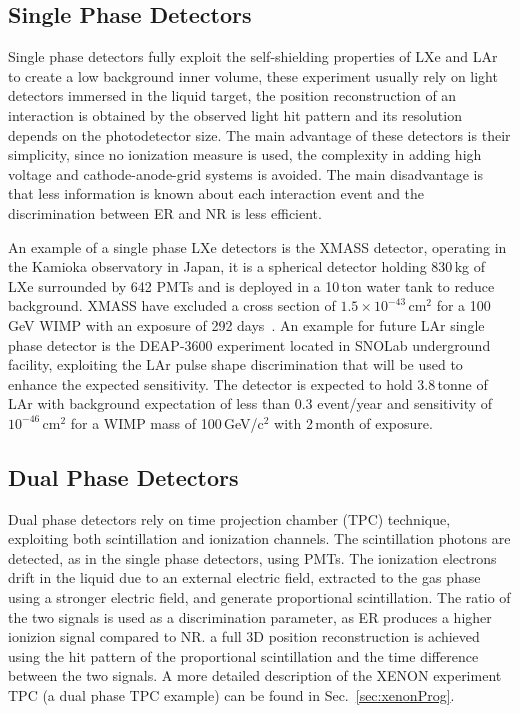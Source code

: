 \subsection{Single Phase Detectors}
\label{sec:singlePhase}
 
Single phase detectors fully exploit the self-shielding properties of LXe and LAr to create a low background inner volume, these experiment usually rely on light detectors immersed in the liquid target, the position reconstruction of an interaction is obtained by the observed light hit pattern and its resolution depends on the photodetector size. The main advantage of these detectors is their simplicity, since no ionization measure is used, the complexity in adding high voltage and cathode-anode-grid systems is avoided. The main disadvantage is that less information is known about each interaction event and the discrimination between ER and NR is less efficient. 

An example of a single phase LXe detectors is the XMASS detector, operating in the Kamioka observatory in Japan, it is a spherical detector holding 830\,kg of LXe surrounded by 642 PMTs and is deployed in a 10\,ton water tank to reduce background. XMASS have excluded a cross section of $1.5\times 10^{-43}$\,cm$^2$ for a 100\,GeV WIMP with an exposure of 292 days~\cite{Hiraide:2016ryf}. An example for future LAr single phase detector is the DEAP-3600 experiment located in SNOLab underground facility, exploiting the LAr pulse shape discrimination that will be used to enhance the expected sensitivity. The detector is expected to hold 3.8\,tonne of LAr with background expectation of less than $0.3$ event/year and sensitivity of $10^{-46}$\,cm$^2$ for a WIMP mass of 100\,GeV/c$^2$ with 2\,month of exposure. 
 
\subsection{Dual Phase Detectors}
\label{sec:dualPhase}

Dual phase detectors rely on time projection chamber (TPC) technique, exploiting both scintillation and ionization channels. The scintillation photons are detected, as in the single phase detectors, using PMTs. The ionization electrons drift in the liquid due to an external electric field, extracted to the gas phase using a stronger electric field, and generate proportional scintillation. The ratio of the two signals is used as a discrimination parameter, as ER produces a higher ionizion signal compared to NR. a full 3D position reconstruction is achieved using the hit pattern of the proportional scintillation and the time difference between the two signals. A more detailed description of the XENON experiment TPC (a dual phase TPC example) can be found in Sec.~\ref{sec:xenonProg}.

